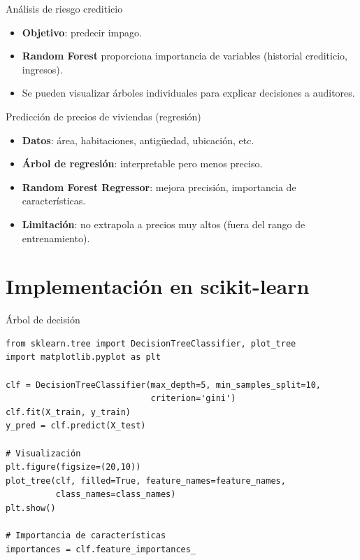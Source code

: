 \documentclass[aspectratio=169, 10pt, xcolor=table]{beamer}
\begin{document}
\begin{frame}{Análisis de riesgo crediticio}
    \begin{itemize}
        \item \textbf{Objetivo}: predecir impago.
        \item \textbf{Random Forest} proporciona importancia de variables (historial crediticio, ingresos).
        \item Se pueden visualizar árboles individuales para explicar decisiones a auditores.
    \end{itemize}
\end{frame}

\begin{frame}{Predicción de precios de viviendas (regresión)}
    \begin{itemize}
        \item \textbf{Datos}: área, habitaciones, antigüedad, ubicación, etc.
        \item \textbf{Árbol de regresión}: interpretable pero menos preciso.
        \item \textbf{Random Forest Regressor}: mejora precisión, importancia de características.
        \item \textbf{Limitación}: no extrapola a precios muy altos (fuera del rango de entrenamiento).
    \end{itemize}
\end{frame}

\section{Implementación en scikit-learn}

\begin{frame}[fragile]{Árbol de decisión}
    \begin{lstlisting}
from sklearn.tree import DecisionTreeClassifier, plot_tree
import matplotlib.pyplot as plt

clf = DecisionTreeClassifier(max_depth=5, min_samples_split=10,
                             criterion='gini')
clf.fit(X_train, y_train)
y_pred = clf.predict(X_test)

# Visualización
plt.figure(figsize=(20,10))
plot_tree(clf, filled=True, feature_names=feature_names,
          class_names=class_names)
plt.show()

# Importancia de características
importances = clf.feature_importances_
    \end{lstlisting}
\end{frame}
\end{document}

